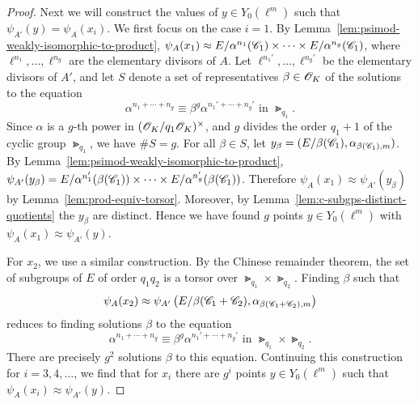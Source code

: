 \documentclass{amsart}
\begin{document}
\begin{proof}
    Next we will construct the values of $y \in Y_0(\ell^m)$ such that $\psi_{A'}(y) = \psi_{A}(x_i)$. We first focus on the case $i = 1$. By Lemma~\ref{lem:psimod-weakly-isomorphic-to-product}, $\psi_{A}(x_1) \approx E/\alpha^{n_1}(\mathscr{C}_1) \times \cdots \times E/\alpha^{n_g}(\mathscr{C}_1)$, where $\ell^{n_1},\dots,\ell^{n_g}$ are the elementary divisors of $A$. 
    Let $\ell^{n_1'},\dots,\ell^{n_g'}$ be the elementary divisors of $A'$, and let $S$ denote a set of representatives $\beta \in \mathscr{O}_K$ of the solutions to the equation
    \[
      \alpha^{n_1 + \cdots + n_g} \equiv \beta^g\alpha^{n_1' + \cdots + n_g'}
      \text{ in } \Gt_{q_1}.
    \]
Since $\alpha$ is a $g$-th power in  $(\mathscr{O}_K/q_1\mathscr{O}_K)^\times$, and  $g$ divides the order $q_1 + 1$ of the cyclic group $\Gt_{q_1}$, 
   we have $\#S = g$. For all $\beta \in S$, let $y_\beta = (E/\beta(\mathscr{C}_1),\alpha_{\beta(\mathscr{C}_1),m})$. By Lemma~\ref{lem:psimod-weakly-isomorphic-to-product}, $\psi_{A'}(y_\beta) = E/\alpha^{n_1'}(\beta(\mathscr{C}_1)) \times \cdots \times E/\alpha^{n_g'}(\beta(\mathscr{C}_1))$. Therefore $\psi_A(x_1) \approx \psi_{A'}(y_\beta)$ by Lemma~\ref{lem:prod-equiv-torsor}. Moreover, by Lemma~\ref{lem:c-subgps-distinct-quotients} the $y_\beta$ are distinct. Hence we have found $g$ points $y \in Y_0(\ell^m)$ with $\psi_{A}(x_1) \approx \psi_{A'}(y)$.

  For $x_2$, we use a similar construction. By the Chinese remainder theorem, the set of subgroups of $E$ of order $q_1q_2$ is a torsor over $\Gt_{q_1} \times \Gt_{q_2}$. Finding $\beta$ such that
  \[
    \psi_{A}(x_2) \approx \psi_{A'}\left(E/\beta(\mathscr{C}_1+\mathscr{C}_2),\alpha_{\beta(\mathscr{C}_1+\mathscr{C}_2),m}\right)
  \]
  reduces to finding solutions $\beta$ to the equation
  \[
    \alpha^{n_1 + \cdots + n_g} \equiv \beta^g\alpha^{n_1' + \cdots + n_g'}
    \text{ in } \Gt_{q_1} \times \Gt_{q_2}.
  \]
There are precisely $g^2$ solutions $\beta$ to this equation. Continuing this construction for $i=3,4,\dots$, we find that for $x_i$ there are $g^i$ points $y \in Y_0(\ell^m)$ such that $\psi_{A}(x_i) \approx \psi_{A'}(y)$.
\end{proof}
\end{document}
